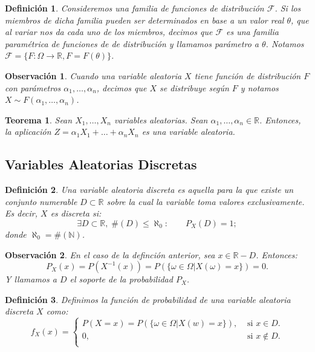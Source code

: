 \documentclass{report}
\newtheorem{thm}{Teorema}[section]
\newtheorem{dfn}{Definición}[section]
\newtheorem{obs}{Observación}[section]
\begin{document}
\begin{dfn}
    Consideremos una familia de funciones de distribución $\mathcal{F}$. Si los miembros de dicha familia pueden ser determinados en base a un
    valor real $\theta$, que al variar nos da cada uno de los miembros, decimos que $\mathcal{F}$ es una familia \emph{paramétrica} de funciones de
    de distribución y llamamos \emph{parámetro} a $\theta$. Notamos $\mathcal{F}=\{F:\Omega\rightarrow\mathbb{R}, F=F(\theta)\}$.
\end{dfn}

\begin{obs}
    Cuando una variable aleatoria $X$ tiene función de distribución $F$ con parámetros $\alpha_1,\ldots,\alpha_n$, decimos que $X$ \emph{se distribuye} según $F$  y notamos
    $X\sim F(\alpha_1,\ldots,\alpha_n)$.
\end{obs}

\begin{thm}
    Sean $X_1,\ldots, X_n$ variables aleatorias. Sean  $\alpha_1,\ldots, \alpha_n \in \mathbb{R}$.
    Entonces, la aplicación $Z= \alpha_1 X_1 + \ldots + \alpha_n X_n$ es una variable aleatoria.
\end{thm}

\subsection{Variables Aleatorias Discretas}

\begin{dfn}
Una \emph{variable aleatoria discreta} es aquella para la que existe un conjunto numerable $D\subset \mathbb{R}$ sobre la cual
la variable toma valores exclusivamente. Es decir, $X$ es discreta si:
\begin{equation*}
    \exists D\subset\mathbb{R}, \; \#(D)\leq \aleph_0 : \qquad P_X(D)=1;
\end{equation*}
donde $\aleph_0 = \#(\mathbb{N})$.
\end{dfn}

\begin{obs}
    En el caso de la definción anterior, sea $x\in \mathbb{R}-D$. Entonces:
    \begin{equation*}
    P_X(x) = P(X^{-1}(x))=P\left( \{\omega \in \Omega | X(\omega)=x \} \right) = 0.
    \end{equation*}
    Y llamamos a $D$ el \emph{soporte} de la probabilidad $P_X$.
\end{obs}

\begin{dfn}
    Definimos la función de probabilidad de una variable aleatoria discreta $X$ como:
    \begin{equation*}
        f_X(x)=\begin{cases}
            P(X=x) = P\left( \{\omega \in \Omega | X(w)=x \} \right), &\text{ si } x\in D.\\
            0, &\text{ si } x\notin D.\\
        \end{cases}
    \end{equation*}
\end{dfn}
\end{document}
